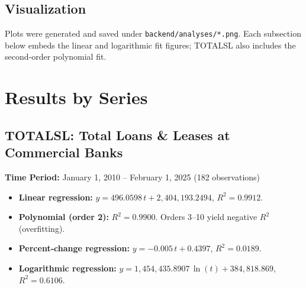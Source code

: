 \documentclass[11pt,a4paper]{article}
\begin{document}
\subsection{Visualization}
Plots were generated and saved under \texttt{backend/analyses/*.png}. Each subsection below embeds the linear and logarithmic fit figures; TOTALSL also includes the second‐order polynomial fit.

\clearpage
\section{Results by Series}

\subsection{TOTALSL: Total Loans \& Leases at Commercial Banks}
\textbf{Time Period:} January 1, 2010 – February 1, 2025 (182 observations)

\begin{itemize}
  \item \textbf{Linear regression:} \(y = 496.0598\,t + 2{,}404{,}193.2494\), \(R^2 = 0.9912\).
  \item \textbf{Polynomial (order 2):} \(R^2 = 0.9900\). Orders 3–10 yield negative \(R^2\) (overfitting).
  \item \textbf{Percent‐change regression:} \(y = -0.005\,t + 0.4397\), \(R^2 = 0.0189\).
  \item \textbf{Logarithmic regression:} \(y = 1{,}454{,}435.8907\,\ln(t) + 384{,}818.869\), \(R^2 = 0.6106\).
\end{itemize}
\end{document}
